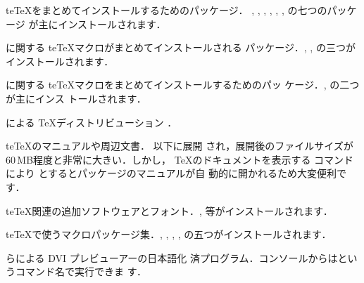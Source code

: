 \begin{rpmlist}
   te\TeX をまとめてインストールするためのパッケージ．
  , , , , 
  , , の七つのパッケージ
   が主にインストールされます．

   に関する te\TeX マクロがまとめてインストールされる
   パッケージ．, ,
   の三つがインストールされます．

   に関する te\TeX マクロをまとめてインストールするためのパッ
   ケージ．, の二つが主にインス
   トールされます．
 
   による \TeX ディストリビューション
   ．
 
   te\TeX のマニュアルや周辺文書． 以下に展開
   され，展開後のファイルサイズが 60\,MB程度と非常に大きい．しかし，
   \TeX のドキュメントを表示する コマンドにより
   とするとパッケージのマニュアルが自
   動的に開かれるため大変便利です．
 
   te\TeX 関連の追加ソフトウェアとフォント．, 
   等がインストールされます．

   te\TeX で使うマクロパッケージ集．,
   , , ,
    の五つがインストールされます．

   らによる DVI プレビューアーの日本語化
   済プログラム．コンソールからはというコマンド名で実行できま
   す．
\end{rpmlist}


